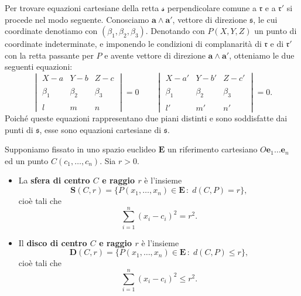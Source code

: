\documentclass{article}
\theoremstyle{plain}
\theoremstyle{definition}
\theoremstyle{remark}
\begin{document}
Per trovare equazioni cartesiane della retta $\mathcal{s}$ perpendicolare comune a $\mathfrak{r}$ e a 
$\mathfrak{r}'$ si procede nel modo seguente.
Conosciamo $\mathbf{a}\wedge\mathbf{a}'$, vettore di direzione $\mathfrak{s}$, le cui coordinate 
denotiamo con $(\beta_1, \beta_2, \beta_3)$. Denotando con $P(X, Y, Z)$ un punto di coordinate indeterminate, 
e imponendo le condizioni di complanarità di $\mathfrak{r}$ e di $\mathfrak{r}'$ con la retta passante per 
$P$ e avente vettore di direzione $\mathbf{a}\wedge\mathbf{a}'$, otteniamo le due seguenti equazioni:
\[
    \begin{vmatrix}
    X - a & Y - b & Z - c \\\\
    \beta_1 & \beta_2 & \beta_3 \\\\
    l & m & n
    \end{vmatrix} = 0\quad\quad
    \begin{vmatrix}
    X - a' & Y - b' & Z - c' \\\\
    \beta_1 & \beta_2 & \beta_3 \\\\
    l' & m' & n'
    \end{vmatrix} = 0.
\]
Poiché queste equazioni rappresentano due piani distinti e sono soddisfatte dai punti di $\mathfrak{s}$, 
esse sono equazioni cartesiane di $\mathfrak{s}$.

\vspace{20pt}

Supponiamo fissato in uno spazio euclideo $\mathbf{E}$ un riferimento cartesiano 
$O\mathbf{e}_1 \ldots \mathbf{e}_n$ ed un punto $C(c_1, \ldots, c_n)$. Sia $r > 0$.
\begin{itemize}
    \item La \textbf{sfera di centro $C$ e raggio $r$} è l'insieme
        \[\mathbf{S}(C, r)=\{P(x_1, \ldots, x_n)\in\mathbf{E}\,:\;d(C, P) = r\},\]
        cioè tali che
        \begin{equation}\label{diciannoveundici}
        \sum_{i=1}^{n}(x_i - c_i)^2 = r^2.
        \end{equation}
    \item Il \textbf{disco di centro $C$ e raggio $r$} è l'insieme
        \[\mathbf{D}(C, r)=\{P(x_1, \ldots, x_n)\in\mathbf{E}\,:\;d(C, P) \leq r\},\]
        cioè tali che
        \begin{equation}
        \sum_{i=1}^{n}(x_i - c_i)^2 \leq r^2.
        \end{equation}
\end{itemize}
\end{document}
